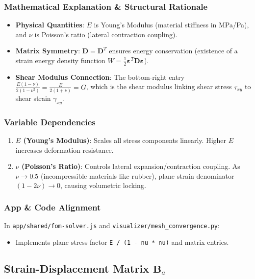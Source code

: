 \subsubsection{Mathematical Explanation \& Structural Rationale}
\begin{itemize}
    \item \textbf{Physical Quantities}: $E$ is Young's Modulus (material stiffness in MPa/Pa), and $\nu$ is Poisson's ratio (lateral contraction coupling).
    \item \textbf{Matrix Symmetry}: $\mathbf{D} = \mathbf{D}^T$ ensures energy conservation (existence of a strain energy density function $W = \frac{1}{2} \boldsymbol{\varepsilon}^T \mathbf{D} \boldsymbol{\varepsilon}$).
    \item \textbf{Shear Modulus Connection}: The bottom-right entry $\frac{E (1-\nu)}{2(1-\nu^2)} = \frac{E}{2(1+\nu)} = G$, which is the shear modulus linking shear stress $\tau_{xy}$ to shear strain $\gamma_{xy}$.
\end{itemize}

\subsubsection{Variable Dependencies}
\begin{enumerate}
    \item \textbf{$E$ (Young's Modulus)}: Scales all stress components linearly. Higher $E$ increases deformation resistance.
    \item \textbf{$\nu$ (Poisson's Ratio)}: Controls lateral expansion/contraction coupling. As $\nu \to 0.5$ (incompressible materials like rubber), plane strain denominator $(1 - 2\nu) \to 0$, causing volumetric locking.
\end{enumerate}

\subsubsection{App \& Code Alignment}
In \texttt{app/shared/fom-solver.js} and \texttt{visualizer/mesh\_convergence.py}:
\begin{itemize}
    \item Implements plane stress factor \texttt{E / (1 - nu * nu)} and matrix entries.
\end{itemize}

\hr

\subsection{Strain-Displacement Matrix $\mathbf{B}_a$}

